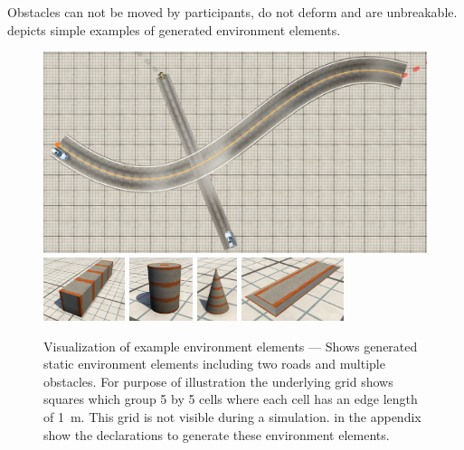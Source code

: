 Obstacles can not be moved by participants, do not deform and are unbreakable.
 depicts simple examples of generated environment elements.
\begin{figure}
    \centering
    \includegraphics[width=\linewidth]{pictures/2019-08-15_simpleLanes.png} %
    \includegraphics[height=70px]{pictures/cube.png}
    \includegraphics[height=70px]{pictures/cylinder.png}
    \includegraphics[height=70px]{pictures/cone.png}
    \includegraphics[height=70px]{pictures/bump.png}
    \medskip
    \caption{%
        Visualization of example environment elements --- Shows generated static environment elements including two roads and multiple obstacles.
        For purpose of illustration the underlying grid shows squares which group 5 by 5 cells where each cell has an edge length of \SI{1}{\metre}.
        This grid is not visible during a simulation.
         in the appendix show the declarations to generate these environment elements.
    }\label{fig:exampleEnvironmentVis}
\end{figure}
